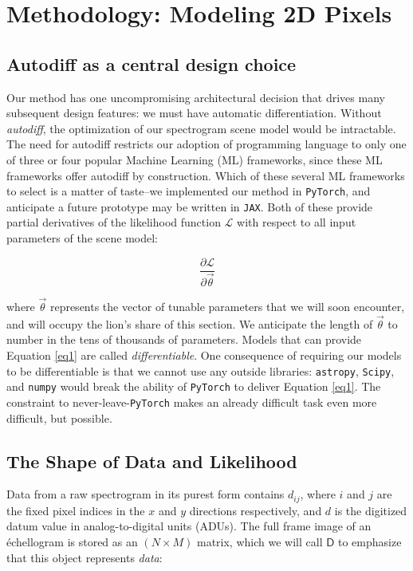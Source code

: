 \documentclass[twocolumn]{aastex631}
\begin{document}
\section{Methodology: Modeling 2D Pixels} \label{secMethod}

\subsection{Autodiff as a central design choice}
Our method has one uncompromising architectural decision that drives many subsequent design features: we must have automatic differentiation.  Without \emph{autodiff}, the optimization of our spectrogram scene model would be intractable.  The need for autodiff restricts our adoption of programming language to only one of three or four popular Machine Learning (ML) frameworks, since these ML frameworks offer autodiff by construction.  Which of these several ML frameworks to select is a matter of taste--we implemented our method in \texttt{PyTorch}, and anticipate a future prototype may be written in \texttt{JAX}.  Both of these provide partial derivatives of the likelihood function $\mathcal{L}$ with respect to all input parameters of the scene model:

\begin{equation}
  \frac{\partial{\mathcal{L}}}{\partial{\vec{\theta}}} \label{eq1}
\end{equation}

\noindent where $\vec{\theta}$ represents the vector of tunable parameters that we will soon encounter, and will occupy the lion's share of this section.  We anticipate the length of $\vec{\theta}$ to number in the tens of thousands of parameters.  Models that can provide Equation \ref{eq1} are called \emph{differentiable}.  One consequence of requiring our models to be differentiable is that we cannot use any outside libraries: \texttt{astropy}, \texttt{Scipy}, and \texttt{numpy} would break the ability of \texttt{PyTorch} to deliver Equation \ref{eq1}.  The constraint to never-leave-\texttt{PyTorch} makes an already difficult task even more difficult, but possible.


\subsection{The Shape of Data and Likelihood}
Data from a raw spectrogram in its purest form contains $d_{ij}$, where $i$ and $j$ are the fixed pixel indices in the $x$ and $y$ directions respectively, and $d$ is the digitized datum value in analog-to-digital units (ADUs).  The full frame image of an \'echellogram is stored as an $(N \times M)$ matrix, which we will call $\boldsymbol{\mathsf{D}}$ to emphasize that this object represents \emph{data}:
\end{document}
